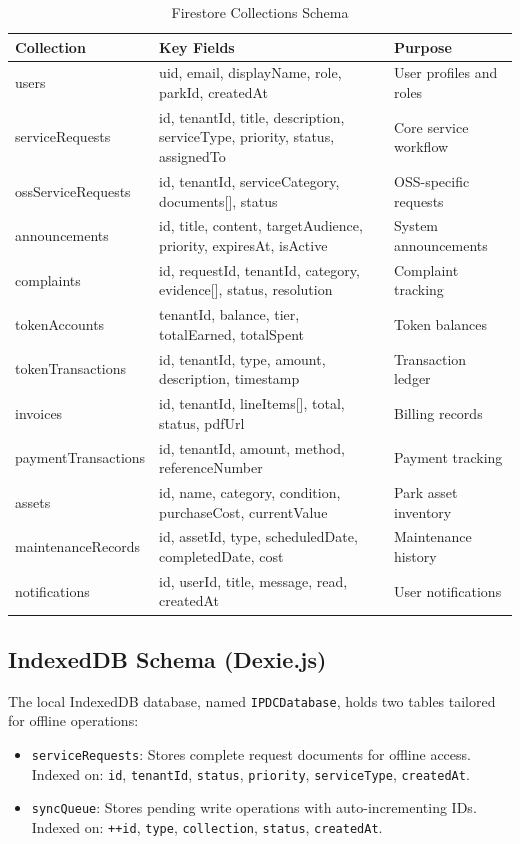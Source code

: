 \begin{table}[H]
\centering
\caption{Firestore Collections Schema}
\label{tab:firestore-schema}
\small
\begin{tabular}{p{3cm}p{5cm}p{4cm}}
\toprule
\textbf{Collection} & \textbf{Key Fields} & \textbf{Purpose} \\
\midrule
users & uid, email, displayName, role, parkId, createdAt & User profiles and roles \\
serviceRequests & id, tenantId, title, description, serviceType, priority, status, assignedTo & Core service workflow \\
ossServiceRequests & id, tenantId, serviceCategory, documents[], status & OSS-specific requests \\
announcements & id, title, content, targetAudience, priority, expiresAt, isActive & System announcements \\
complaints & id, requestId, tenantId, category, evidence[], status, resolution & Complaint tracking \\
tokenAccounts & tenantId, balance, tier, totalEarned, totalSpent & Token balances \\
tokenTransactions & id, tenantId, type, amount, description, timestamp & Transaction ledger \\
invoices & id, tenantId, lineItems[], total, status, pdfUrl & Billing records \\
paymentTransactions & id, tenantId, amount, method, referenceNumber & Payment tracking \\
assets & id, name, category, condition, purchaseCost, currentValue & Park asset inventory \\
maintenanceRecords & id, assetId, type, scheduledDate, completedDate, cost & Maintenance history \\
notifications & id, userId, title, message, read, createdAt & User notifications \\
\bottomrule
\end{tabular}
\end{table}

\subsection{IndexedDB Schema (Dexie.js)}

The local IndexedDB database, named \texttt{IPDCDatabase}, holds two tables tailored for offline operations:

\begin{itemize}
\item \texttt{serviceRequests}: Stores complete request documents for offline access. Indexed on: \texttt{id}, \texttt{tenantId}, \texttt{status}, \texttt{priority}, \texttt{serviceType}, \texttt{createdAt}.
\item \texttt{syncQueue}: Stores pending write operations with auto-incrementing IDs. Indexed on: \texttt{++id}, \texttt{type}, \texttt{collection}, \texttt{status}, \texttt{createdAt}.
\end{itemize}

